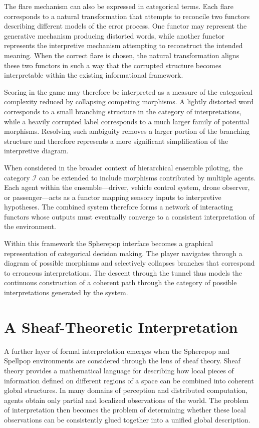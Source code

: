 \documentclass[11pt]{article}
\begin{document}
The flare mechanism can also be expressed in categorical terms. Each flare corresponds to a natural transformation that attempts to reconcile two functors describing different models of the error process. One functor may represent the generative mechanism producing distorted words, while another functor represents the interpretive mechanism attempting to reconstruct the intended meaning. When the correct flare is chosen, the natural transformation aligns these two functors in such a way that the corrupted structure becomes interpretable within the existing informational framework.

Scoring in the game may therefore be interpreted as a measure of the categorical complexity reduced by collapsing competing morphisms. A lightly distorted word corresponds to a small branching structure in the category of interpretations, while a heavily corrupted label corresponds to a much larger family of potential morphisms. Resolving such ambiguity removes a larger portion of the branching structure and therefore represents a more significant simplification of the interpretive diagram.

When considered in the broader context of hierarchical ensemble piloting, the category $\mathcal{I}$ can be extended to include morphisms contributed by multiple agents. Each agent within the ensemble—driver, vehicle control system, drone observer, or passenger—acts as a functor mapping sensory inputs to interpretive hypotheses. The combined system therefore forms a network of interacting functors whose outputs must eventually converge to a consistent interpretation of the environment.

Within this framework the Spherepop interface becomes a graphical representation of categorical decision making. The player navigates through a diagram of possible morphisms and selectively collapses branches that correspond to erroneous interpretations. The descent through the tunnel thus models the continuous construction of a coherent path through the category of possible interpretations generated by the system.

\section{A Sheaf-Theoretic Interpretation}

A further layer of formal interpretation emerges when the Spherepop and Spellpop environments are considered through the lens of sheaf theory. Sheaf theory provides a mathematical language for describing how local pieces of information defined on different regions of a space can be combined into coherent global structures. In many domains of perception and distributed computation, agents obtain only partial and localized observations of the world. The problem of interpretation then becomes the problem of determining whether these local observations can be consistently glued together into a unified global description.
\end{document}

